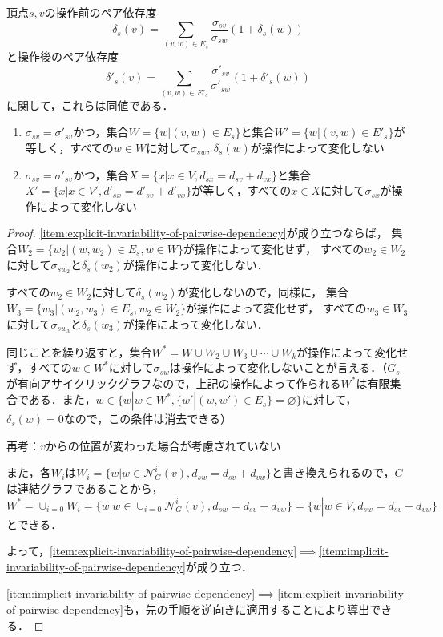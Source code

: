 \begin{lemma}
  \label{lemma:transformation-of-invariability-of-pairwise-dependency}
  頂点$s,v$の操作前のペア依存度
  \begin{equation}
    \label{eq:pairwise-dependency}
    \delta_s(v)=\sum_{(v,w)\in E_s}\frac{\sigma_{sv}}{\sigma_{sw}}(1+\delta_s(w))
  \end{equation}
  と操作後のペア依存度
  \begin{equation}
    \label{eq:pairwise-dependency-after-update}
    \delta'_s(v)=\sum_{(v,w)\in E'_s}\frac{\sigma'_{sv}}{\sigma'_{sw}}(1+\delta'_s(w))
  \end{equation}
  に関して，これらは同値である．
  \begin{enumerate}
  \item $\sigma_{sv}=\sigma'_{sv}$かつ，集合$W=\{w|(v,w)\in E_s\}$と集合$W'=\{w|(v,w)\in E'_s\}$が等しく，すべての$w\in W$に対して$\sigma_{sw},\,\delta_s(w)$が操作によって変化しない
    \label{item:explicit-invariability-of-pairwise-dependency}
  \item $\sigma_{sv}=\sigma'_{sv}$かつ，集合$X=\{x|x\in V,d_{sx}=d_{sv}+d_{vx}\}$と集合$X'=\{x|x\in V',d'_{sx}=d'_{sv}+d'_{vx}\}$が等しく，すべての$x\in X$に対して$\sigma_{sx}$が操作によって変化しない
    \label{item:implicit-invariability-of-pairwise-dependency}
  \end{enumerate}
\end{lemma}
\begin{proof}
  \ref{item:explicit-invariability-of-pairwise-dependency}が成り立つならば，
  集合$W_2=\{w_2|(w,w_2)\in E_s,w\in W\}$が操作によって変化せず，
  すべての$w_2\in W_2$に対して$\sigma_{sw_2}$と$\delta_s(w_2)$が操作によって変化しない．

  すべての$w_2\in W_2$に対して$\delta_s(w_2)$が変化しないので，同様に，
  集合$W_3=\{w_3|(w_2,w_3)\in E_s,w_2\in W_2\}$が操作によって変化せず，
  すべての$w_3\in W_3$に対して$\sigma_{sw_3}$と$\delta_s(w_3)$が操作によって変化しない．

  同じことを繰り返すと，集合$W^*=W\cup W_2\cup W_3\cup\cdots\cup W_k$が操作によって変化せず，すべての$w\in W^*$に対して$\sigma_{sw}$は操作によって変化しないことが言える．（$G_s$が有向アサイクリックグラフなので，上記の操作によって作られる$W^*$は有限集合である．また，$w\in\{w|w\in W^*,\{w'|(w,w')\in E_s\}=\varnothing\}$に対して，$\delta_s(w)=0$なので，この条件は消去できる）

  再考：$v$からの位置が変わった場合が考慮されていない
  
  また，各$W_i$は$W_i=\{w|w\in\mathcal{N}^i_G(v),d_{sw}=d_{sv}+d_{vw}\}$と書き換えられるので，$G$は連結グラフであることから，$W^*=\cup_{i=0}W_i=\{w|w\in\cup_{i=0}\mathcal{N}^i_G(v),d_{sw}=d_{sv}+d_{vw}\}=\{w|w\in V,d_{sw}=d_{sv}+d_{vw}\}$とできる．

  よって，\ref{item:explicit-invariability-of-pairwise-dependency}$\implies$\ref{item:implicit-invariability-of-pairwise-dependency}が成り立つ．

  \ref{item:implicit-invariability-of-pairwise-dependency}$\implies$\ref{item:explicit-invariability-of-pairwise-dependency}も，先の手順を逆向きに適用することにより導出できる．
\end{proof}

